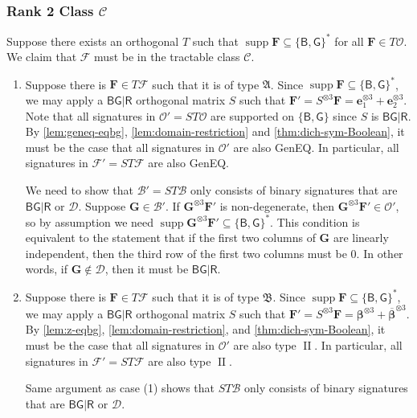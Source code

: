 \documentclass[11pt]{article}
\DeclareMathOperator{\supp}{supp}
\DeclareMathOperator{\typeii}{II}
\newcommand{\db}{\mathsf{B}}
\newcommand{\dg}{\mathsf{G}}
\newcommand{\dr}{\mathsf{R}}
\newcommand{\geneq}{\textsf{GenEQ}\xspace}
\newcommand{\teh}{^{\otimes 3}}
\newcommand{\tractBG}{$\mathscr{C}$\xspace}
\newcommand{\ternarytractgeneq}{$\mathfrak{A}$\xspace}
\newcommand{\ternarytractz}{$\mathfrak{B}$\xspace}
\begin{document}
\subsubsection{Rank 2 Class \texorpdfstring{\tractBG}{C}}
\label{subsec:can-be-made-bg}
Suppose there exists an orthogonal $T$ such that $\supp \mathbf{F} \subseteq \{\db, \dg\}^*$ for all $\mathbf{F} \in T \mathcal{O}$.
We claim that $\mathcal{F}$ must be in the tractable class \tractBG.
\begin{enumerate}
  \item Suppose there is $\mathbf{F} \in T \mathcal{F}$ such that it is of type \ternarytractgeneq.
    Since $\supp \mathbf{F} \subseteq \{\db, \dg\}^*$, we may apply a $\db \dg | \dr$ orthogonal matrix $S$ such that $\mathbf{F}' = S\teh \mathbf{F} = \mathbf{e}_1\teh + \mathbf{e}_2\teh$.
    Note that all signatures in $\mathcal{O}' = S T \mathcal{O}$ are supported on $\{\db, \dg\}$ since $S$ is $\db \dg | \dr$.
    By \cref{lem:geneq-eqbg}, \cref{lem:domain-restriction} and \cref{thm:dich-sym-Boolean}, it must be the case that all signatures in $\mathcal{O}'$ are also \geneq.
    In particular, all signatures in $\mathcal{F}' = S T \mathcal{F}$ are also \geneq.

    We need to show that $\mathcal{B}' = S T \mathcal{B}$ only consists of binary signatures that are $\db \dg | \dr$ or $\mathcal{D}$.
Suppose $\mathbf{G} \in \mathcal{B}'$. 
    If $\mathbf{G}\teh \mathbf{F}'$ is non-degenerate, then $\mathbf{G}\teh \mathbf{F}' \in \mathcal{O}'$, so by assumption we need $\supp \mathbf{G}\teh \mathbf{F}' \subseteq \{\db, \dg\}^*$.
    This condition is equivalent to the statement that if the first two columns of $\mathbf{G}$ are linearly independent, then the third row of the first two columns must be $0$. 
    In other words, if $\mathbf{G} \notin \mathcal{D}$, then it must be $\db \dg | \dr$.

  \item Suppose there is $\mathbf{F} \in T \mathcal{F}$ such that it is of type \ternarytractz.
    Since $\supp \mathbf{F} \subseteq \{\db, \dg\}^*$, we may apply a $\db \dg | \dr$ orthogonal matrix $S$ such that $\mathbf{F}' = S\teh \mathbf{F} = \boldsymbol{\beta}\teh + \overline{\boldsymbol{\beta}}\teh$.
    By \cref{lem:z-eqbg}, \cref{lem:domain-restriction}, and \cref{thm:dich-sym-Boolean}, it must be the case that all signatures in $\mathcal{O}'$ are also type $\typeii$.
    In particular, all signatures in $\mathcal{F}' = S T \mathcal{F}$ are also type $\typeii$.

    Same argument as case (1) shows that $ST \mathcal{B}$ only consists of binary signatures that are $\db \dg | \dr$ or $\mathcal{D}$.
\end{enumerate}
\end{document}
